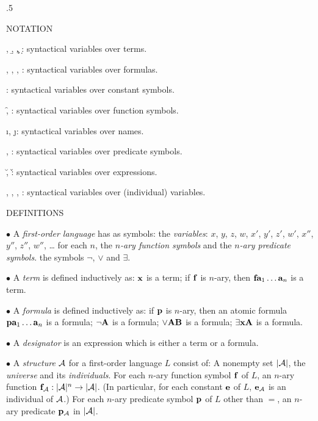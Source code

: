 \vglue .5\baselineskip 

\beginsection NOTATION

{\leftskip 1in
\item{\a, \b, \c, \d:} syntactical variables over terms.
\item{\A, \B, \C, \D:} syntactical variables over formulas.
\item{\e:} syntactical variables over constant symbols.
\item{\f, \g:} syntactical variables over function symbols.
\item{\i, \j:} syntactical variables over names.
\item{\p, \q:} syntactical variables over predicate symbols.
\item{\u, \v:} syntactical variables over expressions.
\item{\x, \y, \z, \w:} syntactical variables over (individual) variables.
\par}

\beginsection DEFINITIONS

\item{$\bullet$} A {\it first-order language} has as symbols:
 the {\it variables}: $x$, $y$, $z$, $w$, $x'$, $y'$, $z'$, $w'$, $x''$, $y''$, $z''$, $w''$, \dots
{} for each $n$, the $n${\it-ary function symbols} and the $n${\it-ary predicate symbols}.
 the symbols $\neg$, $\lor$ and $\exists$.
\smallskip

\item{$\bullet$} A {\it term} is defined inductively as:
 ${\bf x}$ is a term;
 if ${\bf f}$ is $n$-ary, then ${\bf f}{\bf a}_1 \dots {\bf a}_n$ is a term.
\smallskip

\item{$\bullet$} A {\it formula} is defined inductively as:
 if ${\bf p}$ is $n$-ary, then an atomic formula ${\bf p}{\bf a}_1 \dots {\bf a}_n$ is a formula;
 $\neg {\bf A}$ is a formula;
 $\lor{\bf A}{\bf B}$ is a formula;
 $\exists {\bf x}{\bf A}$ is a formula.
\smallskip

\item{$\bullet$} A {\it designator} is an expression which is either a term or a formula.
\smallskip

\item{$\bullet$} A {\it structure} $\cal A$ for a first-order language $L$ consist of:
 A nonempty set $|{\cal A}|$, the {\it universe} and its {\it individuals}.
 For each $n$-ary function symbol ${\bf f}$ of $L$, an $n$-ary function 
${\bf f}_{\cal A} : |{\cal A}|^n \to |{\cal A}|$. (In particular, for each constant 
${\bf e}$ of $L$, ${\bf e}_{\cal A}$ is an individual of $\cal A$.)
 For each $n$-ary predicate symbol ${\bf p}$ of $L$ other than $=$, an 
$n$-ary predicate ${\bf p}_{\cal A}$ in $|{\cal A}|$.

